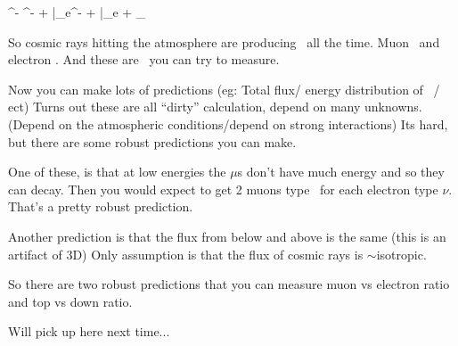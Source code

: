 {\be
\pi^- \rightarrow \mu^- + \bar{\nu}_\mu \rightarrow e^- + \bar{\nu_e} + \nu_\mu
\ee

So cosmic rays hitting the atmosphere are producing \nus\ all the time.  
Muon \nus\ and electron \nus. 
And these are \nus\ you can try to measure. 

Now you can make lots of predictions (eg: Total flux/ energy distribution of \nus\ / ect)
Turns out these are all ``dirty'' calculation,  depend on many unknowns. (Depend on the atmospheric conditions/depend on strong interactions) 
Its hard, but there are some robust predictions you can make. 

One of these, is that at low energies the $\mu$s don't have much energy and so they can decay. 
Then you would expect to get 2 muons type \nus\ for each electron type $\nu$. 
That's a pretty robust prediction. 

Another prediction is that the flux from below and above is the same (this is an artifact of 3D) 
Only assumption is that the flux of cosmic rays is $\sim$isotropic.

So there are two robust predictions that you can measure muon vs electron ratio and top vs down ratio. 

Will pick up here next time...

 




}



